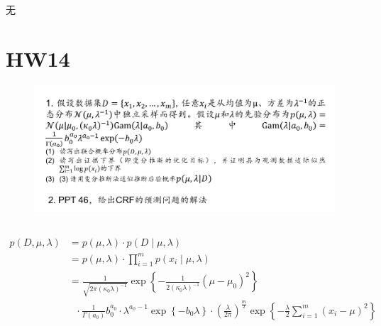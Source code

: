 \documentclass[UTF8,a4paper,AutoFakeBold,AutoFakeSlant]{article}
\begin{document}
无




\section{HW14}

\begin{figure}[H]
  \centering
  \includegraphics[scale=0.675]{hw14.png}
  \label{f:hw14}
\end{figure}



\subsection{}

\subsubsection{}

\begin{equation*}
  \begin{aligned}
    p\left(D, \mu, \lambda\right) & =p(\mu, \lambda) \cdot p(D \mid \mu, \lambda)                                                                                                                                                                                                                  \\
                                  & =p(\mu, \lambda) \cdot \prod_{i=1}^{m} p\left(x_{i} \mid \mu, \lambda\right)                                                                                                                                                                                   \\
                                  & =\frac{1}{\sqrt{2 \pi(\kappa_0\lambda)^{-1}}} \exp \left\{-\frac{1}{2(\kappa _0 \lambda)^{-1}}\left(\mu-\mu_{0}\right)^{2}\right\}                                                                                                                             \\
                                  & ~~~  \cdot  \frac{1}{\Gamma \left(a_{0}\right)} b_{0}^{a_{0}} \cdot \lambda^{a_{0}-1} \exp \left\{-b_{0} \lambda\right\} \cdot\left(\frac{\lambda}{2 \pi}\right)^{\frac{m}{2}} \exp \left\{-\frac{\lambda}{2} \sum_{i=1}^{m}\left(x_{i}-\mu\right)^{2}\right\}
  \end{aligned}
\end{equation*}
\end{document}
